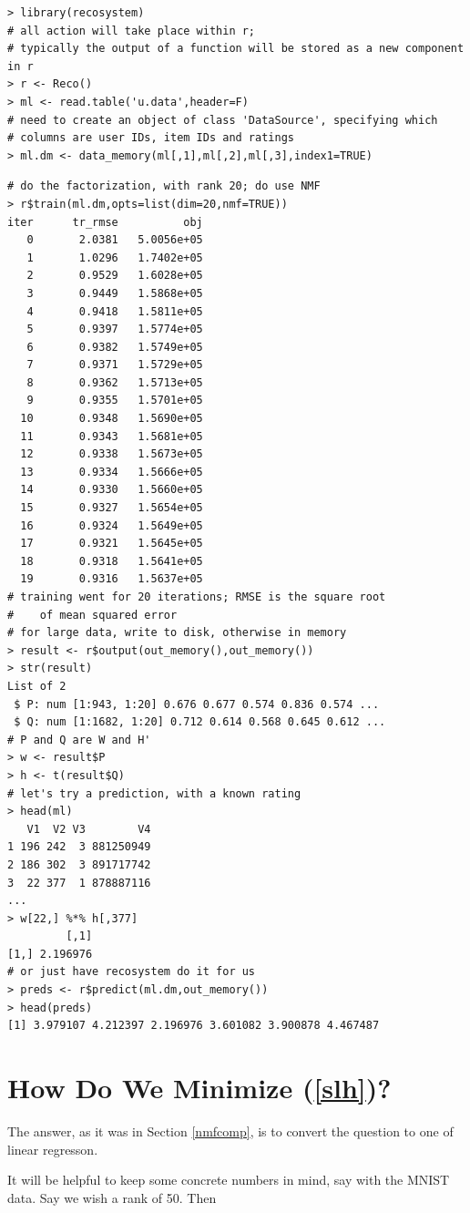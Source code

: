 \begin{lstlisting}
> library(recosystem)
# all action will take place within r;
# typically the output of a function will be stored as a new component in r
> r <- Reco()
> ml <- read.table('u.data',header=F)
# need to create an object of class 'DataSource', specifying which
# columns are user IDs, item IDs and ratings
> ml.dm <- data_memory(ml[,1],ml[,2],ml[,3],index1=TRUE)
\end{lstlisting}

\begin{lstlisting}
# do the factorization, with rank 20; do use NMF
> r$train(ml.dm,opts=list(dim=20,nmf=TRUE))
iter      tr_rmse          obj
   0       2.0381   5.0056e+05
   1       1.0296   1.7402e+05
   2       0.9529   1.6028e+05
   3       0.9449   1.5868e+05
   4       0.9418   1.5811e+05
   5       0.9397   1.5774e+05
   6       0.9382   1.5749e+05
   7       0.9371   1.5729e+05
   8       0.9362   1.5713e+05
   9       0.9355   1.5701e+05
  10       0.9348   1.5690e+05
  11       0.9343   1.5681e+05
  12       0.9338   1.5673e+05
  13       0.9334   1.5666e+05
  14       0.9330   1.5660e+05
  15       0.9327   1.5654e+05
  16       0.9324   1.5649e+05
  17       0.9321   1.5645e+05
  18       0.9318   1.5641e+05
  19       0.9316   1.5637e+05
# training went for 20 iterations; RMSE is the square root
#    of mean squared error
# for large data, write to disk, otherwise in memory
> result <- r$output(out_memory(),out_memory())
> str(result)
List of 2
 $ P: num [1:943, 1:20] 0.676 0.677 0.574 0.836 0.574 ...
 $ Q: num [1:1682, 1:20] 0.712 0.614 0.568 0.645 0.612 ...
# P and Q are W and H'
> w <- result$P
> h <- t(result$Q)
# let's try a prediction, with a known rating
> head(ml)
   V1  V2 V3        V4
1 196 242  3 881250949
2 186 302  3 891717742
3  22 377  1 878887116
...
> w[22,] %*% h[,377]
         [,1]
[1,] 2.196976
# or just have recosystem do it for us
> preds <- r$predict(ml.dm,out_memory())
> head(preds)
[1] 3.979107 4.212397 2.196976 3.601082 3.900878 4.467487
\end{lstlisting}

\section{How Do We Minimize (\ref{slh})?}
\label{howmin}

The answer, as it was in Section \ref{nmfcomp}, is to convert the
question to one of linear regresson.

It will be helpful to keep some concrete numbers in mind, say with the
MNIST data.  Say we wish a rank of 50.  Then

